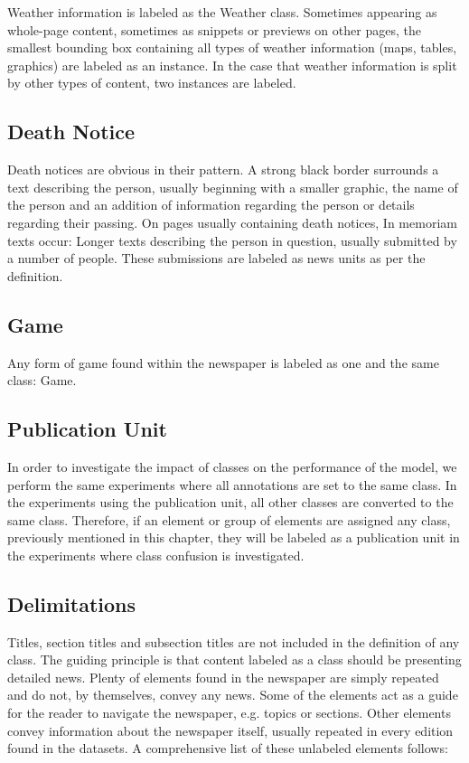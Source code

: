 \documentclass[english, bibtex]{kththesis}
\begin{document}
Weather information is labeled as the Weather class. Sometimes appearing as whole-page content, sometimes as snippets or previews on other pages, the smallest bounding box containing all types of weather information (maps, tables, graphics) are labeled as an instance. In the case that weather information is split by other types of content, two instances are labeled.

\subsection{Death Notice}

Death notices are obvious in their pattern. A strong black border surrounds a text describing the person, usually beginning with a smaller graphic, the name of the person and an addition of information regarding the person or details regarding their passing. On pages usually containing death notices, In memoriam texts occur: Longer texts describing the person in question, usually submitted by a number of people. These submissions are labeled as news units as per the definition. 

\subsection{Game}

Any form of game found within the newspaper is labeled as one and the same class: Game.  

\subsection{Publication Unit}

In order to investigate the impact of classes on the performance of the model, we perform the same experiments where all annotations are set to the same class. In the experiments using the publication unit, all other classes are converted to the same class. Therefore, if an element or group of elements are assigned any class, previously mentioned in this chapter, they will be labeled as a publication unit in the experiments where class confusion is investigated.

\subsection{Delimitations}

Titles, section titles and subsection titles are not included in the definition of any class. The guiding principle is that content labeled as a class should be presenting detailed news. Plenty of elements found in the newspaper are simply repeated and do not, by themselves, convey any news. Some of the elements act as a guide for the reader to navigate the newspaper, e.g. topics or sections. Other elements convey information about the newspaper itself, usually repeated in every edition found in the datasets. A comprehensive list of these unlabeled elements follows:
\end{document}
